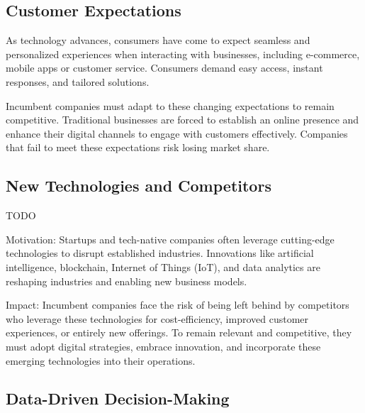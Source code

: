 \documentclass[a4]{scrartcl}
\begin{document}
\subsection{Customer Expectations} \label{subsec:CustomerExpectations}


As technology advances, consumers have come to expect seamless and personalized experiences when interacting with businesses, including e-commerce, mobile apps or customer service. Consumers demand easy access, instant responses, and tailored solutions. \cite{masterthesis,digitalmatrix, leadingdigital}
		
Incumbent companies must adapt to these changing expectations to remain competitive. Traditional businesses are forced to establish an online presence and enhance their digital channels to engage with  customers effectively. Companies that fail to meet these expectations risk losing market share. \cite{masterthesis,digitalmatrix, leadingdigital}

	
	
	
\subsection{New Technologies and Competitors} \label{subsec:NewTechnologiesandCompetitors}

	TODO

	Motivation: Startups and tech-native companies often leverage cutting-edge technologies to disrupt established industries. Innovations like artificial intelligence, blockchain, Internet of Things (IoT), and data analytics are reshaping industries and enabling new business models.
	
	
	
	Impact: Incumbent companies face the risk of being left behind by competitors who leverage these technologies for cost-efficiency, improved customer experiences, or entirely new offerings. To remain relevant and competitive, they must adopt digital strategies, embrace innovation, and incorporate these emerging technologies into their operations.
	
	
\subsection{Data-Driven Decision-Making} \label{subsec:DataDrivenDecisionMaking}
\end{document}
